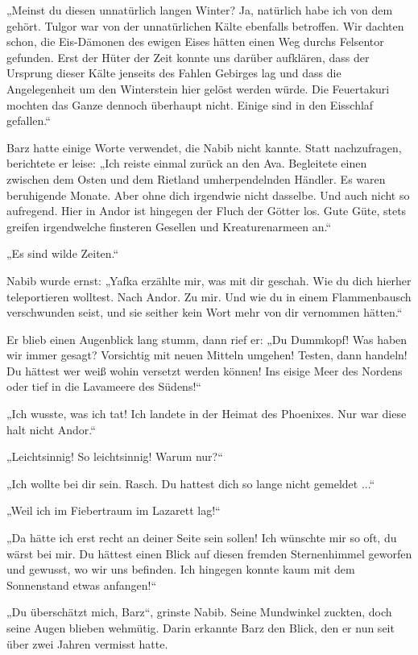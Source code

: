 „Meinst du diesen unnatürlich langen Winter? Ja, natürlich habe ich von dem gehört. Tulgor war von der unnatürlichen Kälte ebenfalls betroffen. Wir dachten schon, die Eis-Dämonen des ewigen Eises hätten einen Weg durchs Felsentor gefunden. Erst der Hüter der Zeit konnte uns darüber aufklären, dass der Ursprung dieser Kälte jenseits des Fahlen Gebirges lag und dass die Angelegenheit um den Winterstein hier gelöst werden würde. Die Feuertakuri mochten das Ganze dennoch überhaupt nicht. Einige sind in den Eisschlaf gefallen.“

Barz hatte einige Worte verwendet, die Nabib nicht kannte. Statt nachzufragen, berichtete er leise: „Ich reiste einmal zurück an den Ava. Begleitete einen zwischen dem Osten und dem Rietland umherpendelnden Händler. Es waren beruhigende Monate. Aber ohne dich irgendwie nicht dasselbe. Und auch nicht so aufregend. Hier in Andor ist hingegen der Fluch der Götter los. Gute Güte, stets greifen irgendwelche finsteren Gesellen und Kreaturenarmeen an.“

„Es sind wilde Zeiten.“

Nabib wurde ernst: „Yafka erzählte mir, was mit dir geschah. Wie du dich hierher teleportieren wolltest. Nach Andor. Zu mir. Und wie du in einem Flammenbausch verschwunden seist, und sie seither kein Wort mehr von dir vernommen hätten.“

Er blieb einen Augenblick lang stumm, dann rief er: „Du Dummkopf! Was haben wir immer gesagt? Vorsichtig mit neuen Mitteln umgehen! Testen, dann handeln! Du hättest wer weiß wohin versetzt werden können! Ins eisige Meer des Nordens oder tief in die Lavameere des Südens!“

„Ich wusste, was ich tat! Ich landete in der Heimat des Phoenixes. Nur war diese halt nicht Andor.“

„Leichtsinnig! So leichtsinnig! Warum nur?“

„Ich wollte bei dir sein. Rasch. Du hattest dich so lange nicht gemeldet ...“

„Weil ich im Fiebertraum im Lazarett lag!“

„Da hätte ich erst recht an deiner Seite sein sollen! Ich wünschte mir so oft, du wärst bei mir. Du hättest einen Blick auf diesen fremden Sternenhimmel geworfen und gewusst, wo wir uns befinden. Ich hingegen konnte kaum mit dem Sonnenstand etwas anfangen!“

„Du überschätzt mich, Barz“, grinste Nabib. Seine Mundwinkel zuckten, doch seine Augen blieben wehmütig. Darin erkannte Barz den Blick, den er nun seit über zwei Jahren vermisst hatte.

